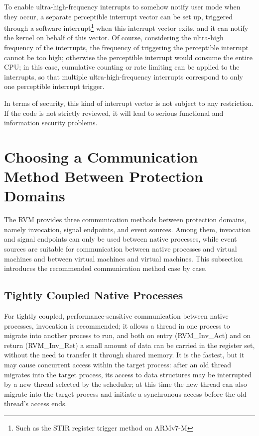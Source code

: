 To enable ultra-high-frequency interrupts to somehow notify user mode when they occur, a separate perceptible interrupt vector can be set up, triggered through a software interrupt\footnote{Such as the STIR register trigger method on ARMv7-M} when this interrupt vector exits, and it can notify the kernel on behalf of this vector. Of course, considering the ultra-high frequency of the interrupts, the frequency of triggering the perceptible interrupt cannot be too high; otherwise the perceptible interrupt would consume the entire CPU; in this case, cumulative counting or rate limiting can be applied to the interrupts, so that multiple ultra-high-frequency interrupts correspond to only one perceptible interrupt trigger.

In terms of security, this kind of interrupt vector is not subject to any restriction. If the code is not strictly reviewed, it will lead to serious functional and information security problems.

\section{Choosing a Communication Method Between Protection Domains}\label{sec:6-4}

The RVM provides three communication methods between protection domains, namely invocation, signal endpoints, and event sources. Among them, invocation and signal endpoints can only be used between native processes, while event sources are suitable for communication between native processes and virtual machines and between virtual machines and virtual machines. This subsection introduces the recommended communication method case by case.

\subsection{Tightly Coupled Native Processes}\label{subsec:6-4-1}

For tightly coupled, performance-sensitive communication between native processes, invocation is recommended; it allows a thread in one process to migrate into another process to run, and both on entry (RVM\_Inv\_Act) and on return (RVM\_Inv\_Ret) a small amount of data can be carried in the register set, without the need to transfer it through shared memory. It is the fastest, but it may cause concurrent access within the target process: after an old thread migrates into the target process, its access to data structures may be interrupted by a new thread selected by the scheduler; at this time the new thread can also migrate into the target process and initiate a synchronous access before the old thread's access ends.

